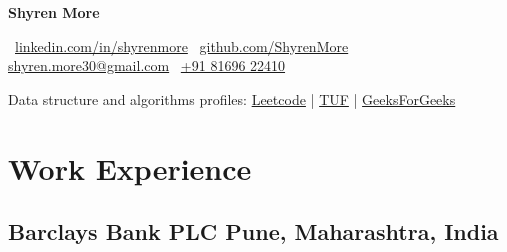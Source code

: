 \documentclass[a4,10pt]{article}
\begin{document}



\begin{center}
    {\Huge \bfseries Shyren More} \\
    
    \vspace{2pt}
    
    \faLinkedin\, \href{https://linkedin.com/in/shyrenmore/}{linkedin.com/in/shyrenmore} \hspace{1em}
    \faGithub\, \href{https://github.com/ShyrenMore}{github.com/ShyrenMore} \hspace{1em}
    \faEnvelope\, \href{mailto:shyren.more30@gmail.com}{shyren.more30@gmail.com} \hspace{1em}
    \faPhone\, \href{tel:+918169622410}{+91 81696 22410}

    \vspace{4pt}

    Data structure and algorithms profiles:
    \href{https://leetcode.com/shyren_more/}{Leetcode} | 
    \href{https://takeuforward.org/plus/profile/shyren_more}{TUF} | 
    \href{https://www.geeksforgeeks.org/user/shyrenmore30/}{GeeksForGeeks}
\end{center}



\vspace{-18pt}
\section{Work Experience}

\subsection*{Barclays Bank PLC \hfill {\normalsize\normalfont Pune, Maharashtra, India}}
\end{document}
